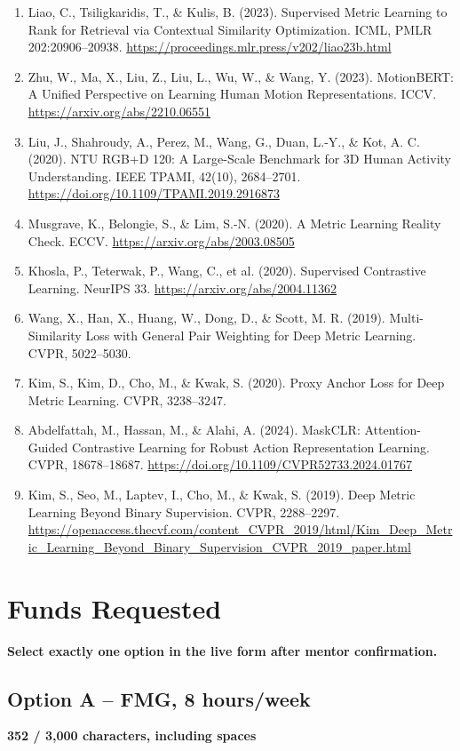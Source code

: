 \documentclass[11pt,letterpaper]{article}
\newcommand{\CharCount}[2]{%
  \begin{flushright}
    \vspace{-7pt}
    {\color{Muted}\bfseries\footnotesize #1 / #2 characters, including spaces}
  \end{flushright}
  \vspace{-3pt}
}
\begin{document}
\begin{enumerate}
  \item Liao, C., Tsiligkaridis, T., \& Kulis, B. (2023). Supervised Metric Learning to Rank for Retrieval via Contextual Similarity Optimization. ICML, PMLR 202:20906--20938. \url{https://proceedings.mlr.press/v202/liao23b.html}
  \item Zhu, W., Ma, X., Liu, Z., Liu, L., Wu, W., \& Wang, Y. (2023). MotionBERT: A Unified Perspective on Learning Human Motion Representations. ICCV. \url{https://arxiv.org/abs/2210.06551}
  \item Liu, J., Shahroudy, A., Perez, M., Wang, G., Duan, L.-Y., \& Kot, A. C. (2020). NTU RGB+D 120: A Large-Scale Benchmark for 3D Human Activity Understanding. IEEE TPAMI, 42(10), 2684--2701. \url{https://doi.org/10.1109/TPAMI.2019.2916873}
  \item Musgrave, K., Belongie, S., \& Lim, S.-N. (2020). A Metric Learning Reality Check. ECCV. \url{https://arxiv.org/abs/2003.08505}
  \item Khosla, P., Teterwak, P., Wang, C., et al. (2020). Supervised Contrastive Learning. NeurIPS 33. \url{https://arxiv.org/abs/2004.11362}
  \item Wang, X., Han, X., Huang, W., Dong, D., \& Scott, M. R. (2019). Multi-Similarity Loss with General Pair Weighting for Deep Metric Learning. CVPR, 5022--5030.
  \item Kim, S., Kim, D., Cho, M., \& Kwak, S. (2020). Proxy Anchor Loss for Deep Metric Learning. CVPR, 3238--3247.
  \item Abdelfattah, M., Hassan, M., \& Alahi, A. (2024). MaskCLR: Attention-Guided Contrastive Learning for Robust Action Representation Learning. CVPR, 18678--18687. \url{https://doi.org/10.1109/CVPR52733.2024.01767}
  \item Kim, S., Seo, M., Laptev, I., Cho, M., \& Kwak, S. (2019). Deep Metric Learning Beyond Binary Supervision. CVPR, 2288--2297. \url{https://openaccess.thecvf.com/content_CVPR_2019/html/Kim_Deep_Metric_Learning_Beyond_Binary_Supervision_CVPR_2019_paper.html}
\end{enumerate}

\section*{Funds Requested}

\textbf{Select exactly one option in the live form after mentor confirmation.}

\subsection*{Option A -- FMG, 8 hours/week}
\CharCount{352}{3,000}
\end{document}
